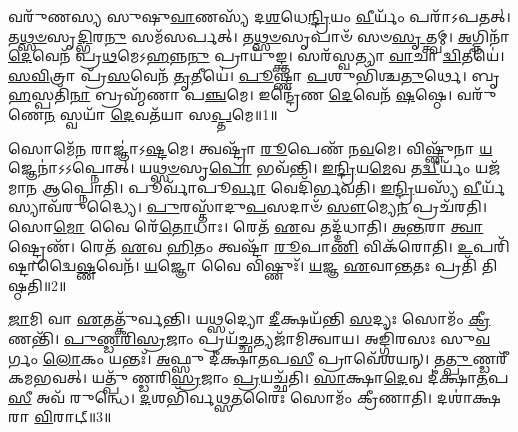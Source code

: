 \clearpage
{}
\setcounter{anuvakam}{0}

𑌵𑌰𑍁᳴𑌣𑌸𑍍𑌯 𑌸𑍁𑌷𑍁\-\ul{𑌵𑌾}\-𑌣𑌸𑍍𑌯᳴ 𑌦\-\ul{𑌶}\-𑌧𑍇\-\ul{𑌨𑍍𑌦𑍍𑌰𑌿}\-𑌯𑌂 \ul{𑌵𑍀}\-𑌰𑍍𑌯𑌂᳴ 𑌪𑌰𑌾᳴\-𑌽𑌪𑌤𑌤𑍍।
𑌤\-\ul{𑌥𑍍𑌸}\-\-\ul{𑍞}\-𑌸𑍃\-\ul{𑌦𑍍𑌭𑌿}\-𑌰\-\ul{𑌨𑍁}\- 𑌸𑌮᳴𑌸𑌰𑍍𑌪𑌤𑍍।
𑌤\-\ul{𑌥𑍍𑌸}\-\-\ul{𑍞}\-𑌸𑍃𑌪𑌾𑍞᳴ 𑌸𑍞\-\ul{𑌸𑍃}\-𑌤𑍍𑌤𑍍𑌵𑌮𑍍।
\-\ul{𑌅}\-𑌗𑍍𑌨𑌿𑌨𑌾᳴ \ul{𑌦𑍇}\-𑌵𑍇𑌨᳴ 𑌪𑍍𑌰\-\ul{𑌥}\-𑌮𑍇\-𑌽\-\ul{𑌹}\-𑌨𑍍𑌨\-\ul{𑌨𑍁} 𑌪𑍍𑌰𑌾𑌯𑍁᳴𑌙𑍍𑌕𑍍𑌤।
𑌸𑌰᳴𑌸𑍍𑌵𑌤𑍍𑌯𑌾 \ul{𑌵𑌾}\-𑌚𑌾 \ul{𑌦𑍍𑌵𑌿}\-𑌤𑍀𑌯𑍇॑।
\-\ul{𑌸}\-\-\ul{𑌵𑌿}\-𑌤𑍍𑌰𑌾 𑌪𑍍𑌰᳴\-\ul{𑌸}\-𑌵𑍇𑌨᳴ \ul{𑌤𑍃}\-𑌤𑍀𑌯𑍇॑।
\-\ul{𑌪𑍂}\-𑌷𑍍𑌣𑌾 \ul{𑌪}\-𑌶𑍁𑌭𑌿᳴𑌶𑍍𑌚\-\ul{𑌤𑍁}\-𑌰𑍍𑌥𑍇।
𑌬𑍃\-\ul{𑌹}\-𑌸𑍍𑌪𑌤𑌿᳴\-\ul{𑌨𑌾} 𑌬𑍍𑌰𑌹𑍍𑌮᳴𑌣𑌾 𑌪\-\ul{𑌞𑍍𑌚}\-𑌮𑍇।
𑌇𑌨𑍍𑌦𑍍𑌰𑍇᳴𑌣 \ul{𑌦𑍇}\-𑌵𑍇𑌨᳴ \ul{𑌷}\-𑌷𑍍𑌠𑍇।
𑌵𑌰𑍁᳴𑌣𑍇\-\ul{𑌨} 𑌸𑍍𑌵𑌯𑌾᳴ \ul{𑌦𑍇}\-𑌵𑌤᳴𑌯𑌾 𑌸\-\ul{𑌪𑍍𑌤}\-𑌮𑍇॥1॥

𑌸𑍋𑌮𑍇᳴\-\ul{𑌨} 𑌰𑌾𑌜𑍍𑌞𑌾॑\-𑌽\-\ul{𑌷𑍍𑌟}\-𑌮𑍇।
𑌤𑍍𑌵𑌷𑍍𑌟𑍍𑌰𑌾᳴ \ul{𑌰𑍂}\-𑌪𑍇𑌣᳴ 𑌨\-\ul{𑌵}\-𑌮𑍇।
𑌵𑌿𑌷𑍍𑌣𑍁᳴𑌨𑌾 \ul{𑌯}\-𑌜𑍍𑌞𑍇𑌨𑌾॑𑌽𑌽𑌪𑍍𑌨𑍋𑌤𑍍।
𑌯\-\ul{𑌥𑍍𑌸}\-\-\ul{𑍞}\-𑌸𑍃\-\ul{𑌪𑍋} 𑌭𑌵᳴𑌨𑍍𑌤𑌿।
\-\ul{𑌇}\-\-\ul{𑌨𑍍𑌦𑍍𑌰𑌿}\-𑌯\-\ul{𑌮𑍇}\-𑌵 𑌤\-\ul{𑌦𑍍𑌵𑍀}\-𑌰𑍍𑌯𑌂᳴ 𑌯𑌜᳴𑌮𑌾𑌨 𑌆𑌪𑍍𑌨𑍋𑌤𑌿।
𑌪𑍂𑌰𑍍𑌵𑌾᳴𑌪𑍂\-\ul{𑌰𑍍𑌵𑌾} 𑌵𑍇𑌦𑌿᳴𑌰𑍍𑌭𑌵𑌤𑌿।
\-\ul{𑌇}\-\-\ul{𑌨𑍍𑌦𑍍𑌰𑌿}\-𑌯𑌸𑍍𑌯᳴ \ul{𑌵𑍀}\-𑌰𑍍𑌯᳴𑌸𑍍𑌯𑌾𑌵᳴𑌰𑍁𑌦𑍍𑌧𑍍𑌯𑍈।
\-\ul{𑌪𑍁}\-𑌰𑌸𑍍𑌤𑌾᳴𑌦𑍁\-\ul{𑌪}\-𑌸𑌦𑌾𑍞᳴ \ul{𑌸𑍗}\-𑌮𑍍𑌯𑍇\-\ul{𑌨} 𑌪𑍍𑌰𑌚᳴𑌰𑌤𑌿।
𑌸𑍋\-\ul{𑌮𑍋} 𑌵𑍈 𑌰𑍇᳴\-\ul{𑌤𑍋}\-𑌧𑌾𑌃।
𑌰𑍇𑌤᳴ \ul{𑌏}\-𑌵 𑌤𑌦𑍍𑌦᳴𑌧𑌾𑌤𑌿।
\-\ul{𑌅}\-\-\ul{𑌨𑍍𑌤}\-𑌰𑌾 \ul{𑌤𑍍𑌵𑌾}\-𑌷𑍍𑌟𑍍𑌰𑍇𑌣᳴।
𑌰𑍇𑌤᳴ \ul{𑌏}\-𑌵 \ul{𑌹𑌿}\-𑌤𑌂 𑌤𑍍𑌵𑌷𑍍𑌟𑌾᳴ \ul{𑌰𑍂}\-𑌪𑌾\-\ul{𑌣𑌿} 𑌵𑌿𑌕᳴𑌰𑍋𑌤𑌿।
\-\ul{𑌉}\-𑌪𑌰𑌿᳴𑌷𑍍𑌟𑌾𑌦𑍍𑌵𑍈\-\ul{𑌷𑍍𑌣}\-𑌵𑍇𑌨᳴।
\-\ul{𑌯}\-𑌜𑍍𑌞𑍋 𑌵𑍈 𑌵𑌿𑌷𑍍𑌣𑍁𑌃᳴।
\-\ul{𑌯}\-𑌜𑍍𑌞 \ul{𑌏}\-𑌵𑌾\-\ul{𑌨𑍍𑌤}\-𑌤𑌃 𑌪𑍍𑌰𑌤𑌿᳴ 𑌤𑌿𑌷𑍍𑌠𑌤𑌿॥2॥\anuvakamend[\-\ul{𑌸}\-\-\ul{𑌪𑍍𑌤}\-𑌮𑍇 𑌦᳴𑌧𑌾\-\ul{𑌤𑌿} 𑌪𑌞𑍍𑌚᳴ 𑌚]

\-\ul{𑌜𑌾}\-𑌮𑌿 𑌵𑌾 \ul{𑌏}\-𑌤𑌤𑍍𑌕𑍁᳴𑌰𑍍𑌵𑌨𑍍𑌤𑌿।
𑌯\-\ul{𑌥𑍍𑌸}\-𑌦𑍍𑌯𑍋 \ul{𑌦𑍀}\-𑌕𑍍𑌷𑌯᳴𑌨𑍍𑌤𑌿 \ul{𑌸}\-𑌦𑍍𑌯𑌃 𑌸𑍋𑌮𑌂᳴ \ul{𑌕𑍍𑌰𑍀}\-𑌣𑌨𑍍𑌤𑌿᳴।
\-\ul{𑌪𑍁}\-\-\ul{𑌣𑍍𑌡}\-\-\ul{𑌰𑌿}\-\-\ul{𑌸𑍍𑌰}\-𑌜𑌾𑌂 𑌪𑍍𑌰𑌯᳴\-\ul{𑌚𑍍𑌛}\-𑌤𑍍𑌯𑌜𑌾᳴𑌮𑌿𑌤𑍍𑌵𑌾𑌯।
𑌅𑌙𑍍𑌗𑌿᳴𑌰𑌸𑌃 𑌸𑍁\-\ul{𑌵}\-𑌰𑍍𑌗𑌂 \ul{𑌲𑍋}\-𑌕𑌂 𑌯𑌨𑍍𑌤𑌃᳴।
\-\ul{𑌅}\-𑌫𑍍𑌸𑍁 𑌦𑍀॑𑌕𑍍𑌷𑌾\-\ul{𑌤}\-𑌪\-\ul{𑌸𑍀} 𑌪𑍍𑌰𑌾𑌵𑍇᳴𑌶𑌯𑌨𑍍।
𑌤\-\ul{𑌤𑍍𑌪𑍁}\-𑌣𑍍𑌡𑌰𑍀᳴𑌕𑌮𑌭𑌵𑌤𑍍।
𑌯𑌤𑍍𑌪𑍁᳴𑌣𑍍𑌡𑌰𑌿\-\ul{𑌸𑍍𑌰}\-𑌜𑌾𑌂 \ul{𑌪𑍍𑌰}\-𑌯𑌚𑍍𑌛᳴𑌤𑌿।
\-\ul{𑌸𑌾}\-𑌕𑍍𑌷𑌾\-\ul{𑌦𑍇}\-𑌵 𑌦𑍀॑𑌕𑍍𑌷𑌾\-\ul{𑌤}\-𑌪\-\ul{𑌸𑍀} 𑌅𑌵᳴ 𑌰𑍁𑌨𑍍𑌧𑍇।
\-\ul{𑌦}\-𑌶𑌭𑌿᳴𑌰𑍍𑌵𑌥𑍍𑌸\-\ul{𑌤}\-𑌰𑍈𑌃 𑌸𑍋𑌮𑌂᳴ 𑌕𑍍𑌰𑍀𑌣𑌾𑌤𑌿।
𑌦𑌶𑌾॑𑌕𑍍𑌷𑌰𑌾 \ul{𑌵𑌿}\-𑌰𑌾𑌟𑍍॥3॥

